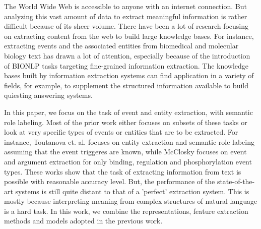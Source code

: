 The World Wide Web is accessible to anyone with an internet connection. But analyzing this vast amount of data to extract meaningful information is rather difficult because of its sheer volume. There have been a lot of research focusing on extracting content from the web to build large knowledge bases. For instance, extracting events and the associated entities from biomedical and molecular biology text has drawn a lot of attention, especially because of the introduction of BIONLP tasks targeting fine-grained information extraction.  The knowledge bases built by information extraction systems can find application in a variety of fields, for example, to supplement the structured information available to build quiesting answering systems.

In this paper, we focus on the task of event and entity extraction, with semantic role labeling. Most of the prior work either focuses on subsets of these tasks or look at very specific types of events or entities that are to be extracted. For instance, Toutanova et. al. focuses on entity extraction and semantic role labeing assuming that the event triggeres are known, while McClosky focuses on event and argument extraction for only binding, regulation and phosphorylation event types. These works show that the task of extracting information from text is possible with reasonable accuracy level.  But, the performance of the state-of-the-art systems is still quite distant to that of a ’perfect’ extraction system. This is mostly because interpreting meaning from complex structures of natural language is a hard task. In this work, we combine the representations, feature extraction methods and models adopted in the previous work.